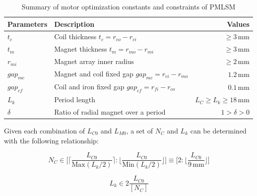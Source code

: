             
            \begin{table}
            \renewcommand{\arraystretch}{1.2}
            \caption{Summary of motor optimization constants and constraints of \acs{PMLSM}}
            \label{table:table_of_optimization_constraints_PMLSM}
            \centering
            \begin{tabular}{llr}
                \hline
                \bfseries Parameters & \bfseries Description & \bfseries Values \\
                \hline
                    $t_c$	        & Coil thickness $t_c = r_{co}-r_{ci}$	    &	$\geq3\,\mathrm{mm}$\\ 
                    $t_m$	        & Magnet thickness $t_m = r_{mo}-r_{mi}$    &	$\geq3\,\mathrm{mm}$\\
                    $r_{mi}$		& Magnet array inner radius 			    &	$\geq2\,\mathrm{mm}$\\ 
                    $gap_{mc}$		& Magnet and coil fixed gap $gap_{mc}=r_{ci}-r_{mo}$    &	$1.2\,\mathrm{mm}$\\ 
                    $gap_{cf}$		& Coil and iron fixed gap $gap_{cf}=r_{fi}-r_{co}$ 	    &	$0.1\,\mathrm{mm}$\\ 
                    $L_k$			& Period length	 						    &	$L_{C} \geq L_k \geq 18\,\mathrm{mm}$\\
                    $\delta$		& Ratio of radial magnet over a period	    & 	$1> \delta >0$\\
                \hline
            \end{tabular}
            \end{table}
            
            
            Given each combination of $L_{C0}$ and $L_{M0}$, a set of $N_C$ and $L_k$ can be determined with the following relationship:
            
            
            \begin{equation}
                N_C \in \Bigg[\bigg\lceil {\frac{L_{C0}}{\mathrm{Max}(L_k/2)}} \bigg\rceil:\bigg\lfloor{\frac{L_{C0}}{\mathrm{Min}(L_k/2)}}\bigg\rfloor\Bigg] \equiv \Bigg[2:\bigg\lfloor{\frac{L_{C0}}{9\,\mathrm{mm}}}\bigg\rfloor\Bigg]
                \label{eq:list of NC}
            \end{equation}
            
            
            \begin{equation}
                L_k \in 2\frac{L_{C0}}{\left[N_C\right]}
                \label{eq:list of L_k}
            \end{equation}
        
